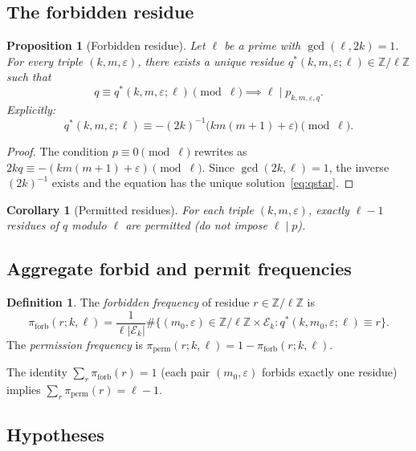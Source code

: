 \documentclass[11pt,a4paper]{article}
\theoremstyle{plain}
\newtheorem{proposition}[theorem]{Proposition}
\newtheorem{corollary}[theorem]{Corollary}
\theoremstyle{definition}
\newtheorem{definition}[theorem]{Definition}
\newcommand{\Z}{\mathbb{Z}}
\newcommand{\PiP}{\pi_{\mathrm{perm}}}
\newcommand{\PiF}{\pi_{\mathrm{forb}}}
\newcommand{\eps}{\varepsilon}
\newcommand{\Eclass}{\mathcal{E}}
\begin{document}
\subsection{The forbidden residue}

\begin{rigorousbox}
\begin{proposition}[Forbidden residue]\label{prop:forbidden}
Let $\ell$ be a prime with $\gcd(\ell, 2k) = 1$. For every triple $(k, m, \eps)$,
there exists a unique residue $q^*(k, m, \eps; \ell) \in \Z/\ell\Z$ such that
\[
q \equiv q^*(k, m, \eps; \ell) \pmod{\ell} \implies \ell \mid p_{k, m, \eps, q}.
\]
Explicitly:
\begin{equation}
q^*(k, m, \eps; \ell) \equiv -(2k)^{-1}\bigl(km(m+1) + \eps\bigr) \pmod{\ell}.
\label{eq:qstar}
\end{equation}
\end{proposition}
\end{rigorousbox}

\begin{proof}
The condition $p \equiv 0 \pmod \ell$ rewrites as
$2kq \equiv -(km(m+1) + \eps) \pmod \ell$. Since $\gcd(2k, \ell) = 1$, the inverse
$(2k)^{-1}$ exists and the equation has the unique solution~\eqref{eq:qstar}.
\end{proof}

\begin{corollary}[Permitted residues]\label{cor:permitted}
For each triple $(k, m, \eps)$, exactly $\ell - 1$ residues of $q$ modulo $\ell$
are \emph{permitted} (do not impose $\ell \mid p$).
\end{corollary}

\subsection{Aggregate forbid and permit frequencies}

\begin{definition}\label{def:perm}
The \emph{forbidden frequency} of residue $r \in \Z/\ell\Z$ is
\[
\PiF(r; k, \ell) = \frac{1}{\ell |\Eclass_k|}
\#\bigl\{(m_0, \eps) \in \Z/\ell\Z \times \Eclass_k : q^*(k, m_0, \eps; \ell) \equiv r\bigr\}.
\]
The \emph{permission frequency} is $\PiP(r; k, \ell) = 1 - \PiF(r; k, \ell)$.
\end{definition}

The identity $\sum_r \PiF(r) = 1$ (each pair $(m_0, \eps)$ forbids exactly one
residue) implies $\sum_r \PiP(r) = \ell - 1$.

\subsection{Hypotheses}
\end{document}
